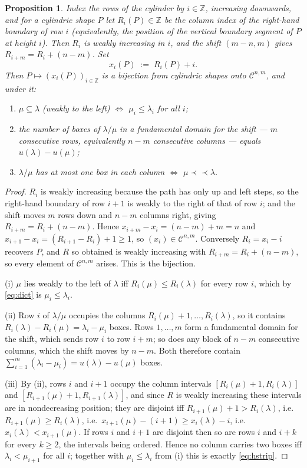 \documentclass[11pt]{article}
\theoremstyle{plain}
\newtheorem{prop}[thm]{Proposition}
\theoremstyle{definition}
\newcommand{\Z}{\mathbb{Z}}
\newcommand{\cyl}{\mathcal{C}}
\newcommand{\hstrip}{\prec\!\!\prec}
\begin{document}
\begin{prop}\label{prop:dictionary}
Index the rows of the cylinder by $i\in\Z$, increasing downwards, and for a cylindric shape $P$
let $R_i(P)\in\Z$ be the column index of the right-hand boundary of row $i$ (equivalently, the
position of the vertical boundary segment of $P$ at height $i$). Then $R_i$ is weakly
increasing in $i$, and the shift $(m-n,m)$ gives $R_{i+m}=R_i+(n-m)$. Set
\begin{equation}\label{eq:dict}
  x_i(P)\;:=\;R_i(P)+i .
\end{equation}
Then $P\mapsto(x_i(P))_{i\in\Z}$ is a bijection from cylindric shapes onto $\cyl^{n,m}$, and
under it:
\begin{enumerate}
\item $\mu\subseteq\lambda$ (weakly to the left) $\iff$ $\mu_i\le\lambda_i$ for all $i$;
\item the number of boxes of $\lambda/\mu$ in a fundamental domain for the shift --- $m$
consecutive rows, equivalently $n-m$ consecutive columns --- equals $u(\lambda)-u(\mu)$;
\item $\lambda/\mu$ has at most one box in each column $\iff$ $\mu\hstrip\lambda$.
\end{enumerate}
\end{prop}

\begin{proof}
$R_i$ is weakly increasing because the path has only up and left steps, so the right-hand
boundary of row $i+1$ is weakly to the right of that of row $i$; and the shift moves $m$ rows
down and $n-m$ columns right, giving $R_{i+m}=R_i+(n-m)$. Hence
$x_{i+m}-x_i=(n-m)+m=n$ and $x_{i+1}-x_i=(R_{i+1}-R_i)+1\ge 1$, so $(x_i)\in\cyl^{n,m}$.
Conversely $R_i=x_i-i$ recovers $P$, and $R$ so obtained is weakly increasing with
$R_{i+m}=R_i+(n-m)$, so every element of $\cyl^{n,m}$ arises. This is the bijection.

(i) $\mu$ lies weakly to the left of $\lambda$ iff $R_i(\mu)\le R_i(\lambda)$ for every row
$i$, which by \eqref{eq:dict} is $\mu_i\le\lambda_i$.

(ii) Row $i$ of $\lambda/\mu$ occupies the columns $R_i(\mu)+1,\dots,R_i(\lambda)$, so it
contains $R_i(\lambda)-R_i(\mu)=\lambda_i-\mu_i$ boxes. Rows $1,\dots,m$ form a fundamental
domain for the shift, which sends row $i$ to row $i+m$; so does any block of $n-m$ consecutive
columns, which the shift moves by $n-m$. Both therefore contain
$\sum_{i=1}^{m}(\lambda_i-\mu_i)=u(\lambda)-u(\mu)$ boxes.

(iii) By (ii), rows $i$ and $i+1$ occupy the column intervals
$[R_i(\mu)+1,R_i(\lambda)]$ and $[R_{i+1}(\mu)+1,R_{i+1}(\lambda)]$, and since $R$ is weakly
increasing these intervals are in nondecreasing position; they are disjoint iff
$R_{i+1}(\mu)+1>R_i(\lambda)$, i.e.\ $R_{i+1}(\mu)\ge R_i(\lambda)$, i.e.\
$x_{i+1}(\mu)-(i+1)\ge x_i(\lambda)-i$, i.e.\ $x_i(\lambda)<x_{i+1}(\mu)$. If rows $i$ and
$i+1$ are disjoint then so are rows $i$ and $i+k$ for every $k\ge 2$, the intervals being
ordered. Hence no column carries two boxes iff $\lambda_i<\mu_{i+1}$ for all $i$; together with
$\mu_i\le\lambda_i$ from (i) this is exactly \eqref{eq:hstrip}.
\end{proof}
\end{document}
